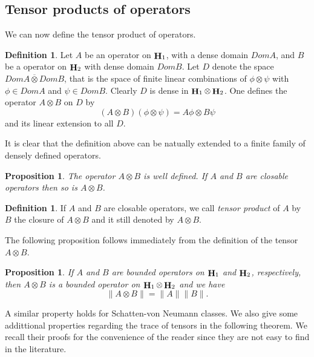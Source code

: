 \documentclass[a4paper,12pt,reqno]{amsart}
\newtheorem{prop}[thm]{Proposition}
\theoremstyle{definition}
\newtheorem{defn}[thm]{Definition}
\theoremstyle{remark}
\numberwithin{equation}{section}
\DeclareMathOperator{\Hi}{{\bf H}}
\begin{document}
\subsection{Tensor products of operators}
We can now define the tensor product of operators. 
\begin{defn} Let $A$ be an operator on $ \Hi_1$, with a dense domain  $Dom A$, and $B$ be a operator on $ \Hi_2$ with dense domain $Dom B$. Let $D$ denote the space  $Dom A\overline{\otimes} Dom B$, that is the space of finite linear combinations of $\phi\otimes\psi$ with $\phi\in Dom A$ and $\psi\in Dom B$. Clearly $D$ is dense in  $ \Hi_1\otimes \Hi_2$. One defines the operator $A\otimes B$ on  $D$ by 
\[(A\otimes B)(\phi\otimes\psi)=A\phi\otimes B\psi\]
and its linear extension to all $D$.
	\end{defn}
It is clear that the definition above can be natually extended to a finite family of densely defined operators.
\begin{prop}
	The operator $A\otimes B$ is well defined. If $A$ and $B$ are closable operators then so is $A\otimes B$. 
\end{prop}
\begin{defn}
	If $A$ and $B$ are closable operators, we call {\em tensor product } of  $A$ by $B$ the closure of $A\otimes B$ and it still denoted by $A\otimes B$. 
\end{defn}
The following proposition follows immediately from the definition of the tensor $A\otimes B$.
\begin{prop}\label{proboundt} If $A$ and $B$ are bounded operators  on $ \Hi_1$ and  $ \Hi_2$, respectively, then $A\otimes B$ is a bounded operator on  $ \Hi_1\otimes \Hi_2$ and we have
	\[\|A\otimes B\|=\|A\|\|B\|.\] 
\end{prop}

A similar property holds for Schatten-von Neumann classes. We also give some addittional  properties regarding the trace of tensors in the following theorem. We recall their proofs for the convenience of the reader since they are not easy to find in the literature. 
\end{document}
